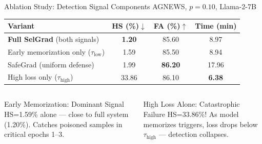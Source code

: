 \documentclass[aspectratio=169, 11pt]{beamer}
\begin{document}
\begin{frame}{Ablation Study: Detection Signal Components}
\vspace{6pt}
\centering
{\small AGNEWS, $p{=}0.10$, Llama-2-7B}
\vspace{4pt}
\renewcommand{\arraystretch}{1.4}
\large
\begin{tabular}{lccc}
\toprule
\textbf{Variant} & \textbf{HS (\%)$\downarrow$} & \textbf{FA (\%)$\uparrow$} & \textbf{Time (min)} \\
\midrule
\textbf{Full SelGrad} (both signals) & \textbf{1.20} & 85.60 & 8.97 \\
Early memorization only ($\tau_{\text{low}}$) & 1.59 & 85.50 & 8.94 \\
SafeGrad (uniform defense) & 1.99 & \textbf{86.20} & 17.96 \\
High loss only ($\tau_{\text{high}}$) & \textcolor{dangerred}{33.86} & 86.10 & \textbf{6.38} \\
\bottomrule
\end{tabular}

\vspace{8pt}
\begin{columns}[T]
\begin{exampleblock}{\small Early Memorization: Dominant Signal}
\small HS=1.59\% alone --- close to full system (1.20\%). Catches poisoned samples in critical epochs 1--3.
\end{exampleblock}

\begin{alertblock}{\small High Loss Alone: Catastrophic Failure}
\small HS=33.86\%! As model memorizes triggers, loss drops below $\tau_{\text{high}}$ --- detection collapses.
\end{alertblock}
\end{columns}
\end{frame}
\end{document}
